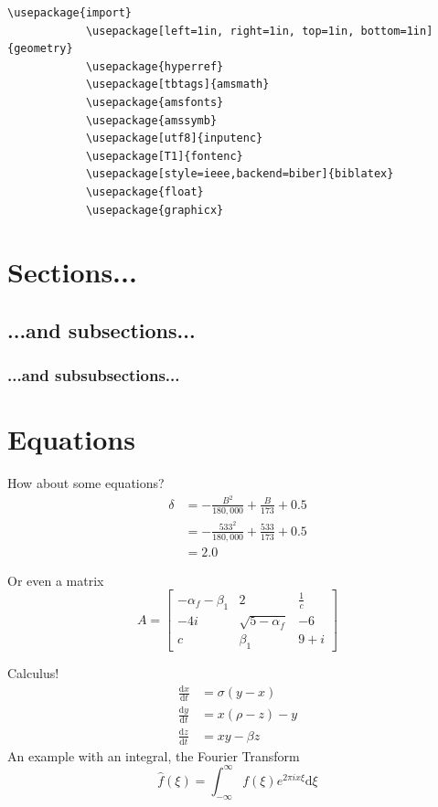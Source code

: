 \documentclass[hidelinks, 12pt]{article}%
\begin{document}
        \begin{lstlisting}[language={[LaTeX]TeX}]
            \usepackage{import}
            \usepackage[left=1in, right=1in, top=1in, bottom=1in]{geometry}
            \usepackage{hyperref}
            \usepackage[tbtags]{amsmath}
            \usepackage{amsfonts}
            \usepackage{amssymb}
            \usepackage[utf8]{inputenc}
            \usepackage[T1]{fontenc}
            \usepackage[style=ieee,backend=biber]{biblatex}
            \usepackage{float}
            \usepackage{graphicx}
        \end{lstlisting}

    \section{Sections...}
        \subsection{...and subsections...}
            \subsubsection{...and subsubsections...}

    \section{Equations}
        How about some equations?
        \begin{align}
            \delta &= - \frac{B^{2}}{180,000} + \frac{B}{173} + 0.5\nonumber\\
            &= - \frac{533^{2}}{180,000} + \frac{533}{173} + 0.5 \nonumber\\
            &= 2.0 \nonumber
        \end{align}
        
        Or even a matrix
        \begin{equation*}
            A = 
            \begin{bmatrix}
                -\alpha_f-\beta_1 & 2 & \frac{1}{c}\\
                -4i & \sqrt{5-\alpha_f} & -6\\
                c & \beta_1 & 9 + i
            \end{bmatrix}
        \end{equation*}

        Calculus!
        \begin{align}
            \frac{\text{d}x}{\text{d}t} &= \sigma (y-x)\\
            \frac{\text{d}y}{\text{d}t} &= x(\rho -z)-y\\
            \frac{\text{d}z}{\text{d}t} &= xy-\beta z
        \end{align}
        An example with an integral, the Fourier Transform
        \begin{equation}
            \hat{f}\left(\xi\right) = \int_{-\infty}^{\infty}f\left(\xi\right)e^{2\pi ix\xi}\text{d}\xi
            \label{eqt:fourTrans}
        \end{equation}
        
\end{document}
